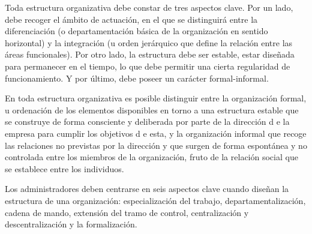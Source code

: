 \documentclass[
]{krantz}
\begin{document}
Toda estructura organizativa debe constar de tres aspectos clave. Por un lado, debe recoger el ámbito de actuación, en el que se distinguirá entre la diferenciación (o departamentación básica de la organización en sentido horizontal) y la integración (u orden jerárquico que define la relación entre las áreas funcionales). Por otro lado, la estructura debe ser estable, estar diseñada para permanecer en el tiempo, lo que debe permitir una cierta regularidad de funcionamiento. Y por último, debe poseer un carácter formal-informal.

En toda estructura organizativa es posible distinguir entre la organización formal, u ordenación de los elementos disponibles en torno a una estructura estable que se construye de forma consciente y deliberada por parte de la dirección d e la empresa para cumplir los objetivos d e esta, y la organización informal que recoge las relaciones no previstas por la dirección y que surgen de forma espontánea y no controlada entre los miembros de la organización, fruto de la relación social que se establece entre los individuos.

Los administradores deben centrarse en seis aspectos clave cuando diseñan la estructura de una organización: especialización del trabajo, departamentalización, cadena de mando, extensión del tramo de control, centralización y descentralización y la formalización.
\end{document}

